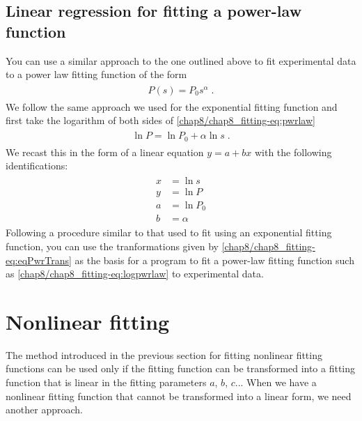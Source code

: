 \documentclass[letterpaper,10pt,english]{sphinxmanual}
\begin{document}

\subsection{Linear regression for fitting a power-law function}
\label{chap8/chap8_fitting:linear-regression-for-fitting-a-power-law-function}\label{chap8/chap8_fitting:index-3}
You can use a similar approach to the one outlined above to fit experimental data to a power law fitting function of the form
\label{chap8/chap8_fitting:equation-eq:pwrlaw}\begin{gather}
\begin{split}P(s) = P_0 s^\alpha \;.\end{split}\label{chap8/chap8_fitting-eq:pwrlaw}
\end{gather}
We follow the same approach we used for the exponential fitting function and first take the logarithm of both sides of \eqref{chap8/chap8_fitting-eq:pwrlaw}
\label{chap8/chap8_fitting:equation-eq:logpwrlaw}\begin{gather}
\begin{split}\ln P = \ln P_0 + \alpha \ln s \;.\end{split}\label{chap8/chap8_fitting-eq:logpwrlaw}
\end{gather}
We recast this in the form of a linear equation $y = a + bx$ with the following identifications:
\label{chap8/chap8_fitting:equation-eq:eqPwrTrans}\begin{gather}
\begin{split}x &= \ln s\\
y &= \ln P\\
a &= \ln P_{0}\\
b &= \alpha\end{split}\label{chap8/chap8_fitting-eq:eqPwrTrans}
\end{gather}
Following a procedure similar to that used to fit using an exponential fitting function, you can use the tranformations given by \eqref{chap8/chap8_fitting-eq:eqPwrTrans} as the basis for a program to fit a power-law fitting function such as \eqref{chap8/chap8_fitting-eq:logpwrlaw} to experimental data.


\section{Nonlinear fitting}
\label{chap8/chap8_fitting:index-4}\label{chap8/chap8_fitting:sec-nonlinfit}\label{chap8/chap8_fitting:nonlinear-fitting}
The method introduced in the previous section for fitting nonlinear fitting functions can be used only if the fitting function can be transformed into a fitting function that is linear in the fitting parameters  $a$, $b$, $c$...  When we have a nonlinear fitting function that cannot be transformed into a linear form, we need another approach.
\end{document}
